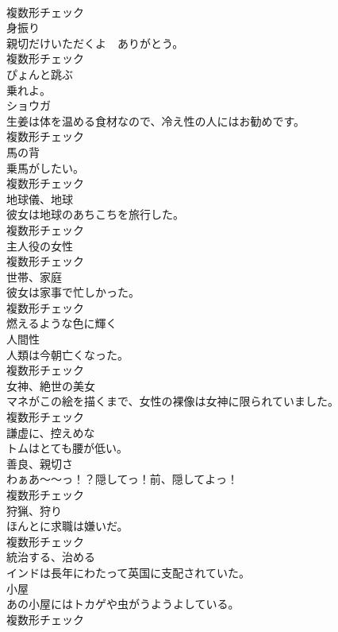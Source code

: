 \documentclass[8pt]{extreport}
\begin{document}
\begin{CJK}{UTF8}{min}
\\	複数形チェック
\\	[名詞]	身振り	
\\	親切だけいただくよ　ありがとう。	
\\	複数形チェック
\\	[動詞]	ぴょんと跳ぶ	
\\	乗れよ。	
\\	[名詞]	ショウガ	
\\	生姜は体を温める食材なので、冷え性の人にはお勧めです。	
\\	複数形チェック
\\	[名詞]	馬の背	
\\	乗馬がしたい。	
\\	複数形チェック
\\	[名詞]	地球儀、地球	
\\	彼女は地球のあちこちを旅行した。	
\\	複数形チェック
\\	[名詞]	主人役の女性	
\\	複数形チェック
\\	[名詞]	世帯、家庭	
\\	彼女は家事で忙しかった。	
\\	複数形チェック
\\	[動詞]	燃えるような色に輝く	
\\	[名詞]	人間性	
\\	人類は今朝亡くなった。	
\\	複数形チェック
\\	[名詞]	女神、絶世の美女	
\\	マネがこの絵を描くまで、女性の裸像は女神に限られていました。	
\\	複数形チェック
\\	[形容詞]	謙虚に、控えめな	
\\	トムはとても腰が低い。	
\\	[名詞]	善良、親切さ	
\\	わぁあ～～っ！？隠してっ！前、隠してよっ！	
\\	複数形チェック
\\	[名詞]	狩猟、狩り	
\\	ほんとに求職は嫌いだ。	
\\	複数形チェック
\\	[動詞]	統治する、治める	
\\	インドは長年にわたって英国に支配されていた。	
\\	[名詞]	小屋	
\\	あの小屋にはトカゲや虫がうようよしている。	
\\	複数形チェック

\end{CJK}
\end{document}
